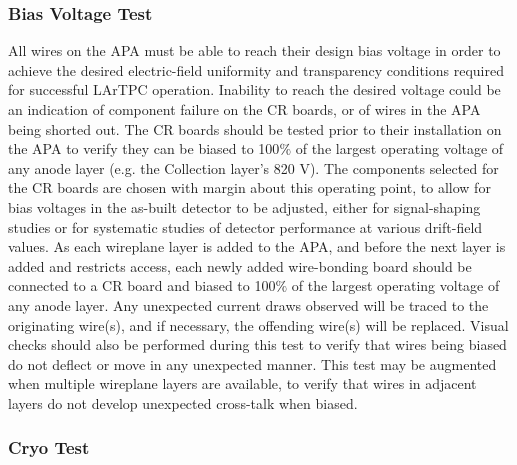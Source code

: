 \subsubsection{Bias Voltage Test}

All wires on the APA must be able to reach their design bias voltage in order to achieve the desired electric-field uniformity and transparency conditions required for successful LArTPC operation.  Inability to reach the desired voltage could be an indication of component failure on the CR boards, or of wires in the APA being shorted out.  The CR boards should be tested prior to their installation on the APA to verify they can be biased to 100$\%$ of the largest operating voltage of any anode layer (e.g. the Collection layer's 820 V).  The components selected for the CR boards are chosen with margin about this operating point, to allow for bias voltages in the as-built detector to be adjusted, either for signal-shaping studies or for systematic studies of detector performance at various drift-field values.  As each wireplane layer is added to the APA, and before the next layer is added and restricts access, each newly added wire-bonding board should be connected to a CR board and biased to 100$\%$ of the largest operating voltage of any anode layer.  Any unexpected current draws observed will be traced to the originating wire(s), and if necessary, the offending wire(s) will be replaced.  Visual checks should also be performed during this test to verify that wires being biased do not deflect or move in any unexpected manner.  This test may be augmented when multiple wireplane layers are available, to verify that wires in adjacent layers do not develop unexpected cross-talk when biased.

\subsubsection{Cryo Test}

